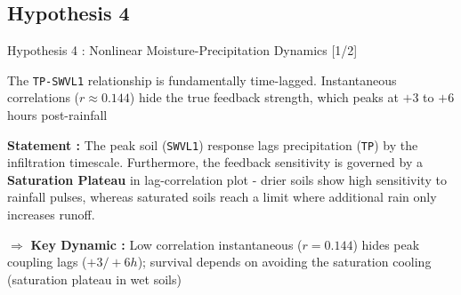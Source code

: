 \subsection{Hypothesis 4}
\begin{frame}{Hypothesis 4 : Nonlinear Moisture-Precipitation Dynamics [1/2]}
	\vspace{-0.1cm}
	\begin{block}{The \texttt{TP-SWVL1} relationship is fundamentally time-lagged. Instantaneous correlations ($r \approx 0.144$) hide the true feedback strength, which peaks at $+3$ to $+6$ hours post-rainfall}\end{block}

	\vspace{0.15cm}
	\footnotesize
	\textbf{Statement :} The peak soil (\texttt{SWVL1}) response lags precipitation (\texttt{TP}) by the infiltration timescale. Furthermore, the feedback sensitivity is governed by a \textbf{Saturation Plateau} in lag-correlation plot - drier soils show high sensitivity to rainfall pulses, whereas saturated soils reach a limit where additional rain only increases runoff.

	\vspace{0.2cm}
	\footnotesize
	$\Rightarrow$ \textbf{Key Dynamic :} Low correlation instantaneous ($r=0.144$) hides peak coupling lags ($+3/+6h$); survival depends on avoiding the saturation cooling (saturation plateau in wet soils)


\end{frame}
